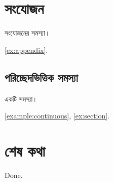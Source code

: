 \documentclass[11pt,oneside,openany]{bookbangla}
\begin{document}
\chapter{সংযোজন}
\begin{exercise}\label{ex:appendix}সংযোজনের সমস্যা।\end{exercise}
\autoref{ex:appendix}.
\section{পরিচ্ছেদভিত্তিক সমস্যা}
\begin{exercise}\label{ex:section}একটি সমস্যা।\end{exercise}
\autoref{example:continuous}, \autoref{ex:section}.
\backmatter
\chapter{শেষ কথা}
Done.
\end{document}
